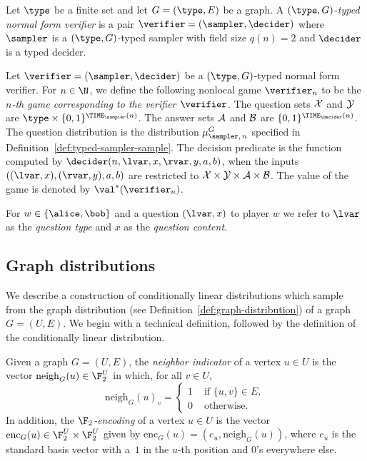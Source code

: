 \begin{definition}
  \label{def:typed-normal-ver}
  Let $\type$ be a finite set and let $G = (\type, E)$ be a graph.
  A $(\type, G)$-\emph{typed normal form verifier} is a pair $\verifier =
  (\sampler, \decider)$ where $\sampler$ is a $(\type,G)$-typed sampler with field
  size $q(n) = 2$ and $\decider$ is a typed decider.
\end{definition}

\begin{definition}
  \label{def:typed-normal-game}
  Let $\verifier = (\sampler, \decider)$ be a $(\type, G)$-typed normal form
  verifier.
  For $n \in \N$, we define the following nonlocal game $\verifier_{n}$ to be
  the \emph{$n$-th game corresponding to the verifier $\verifier$}.
  The question sets $\cal{X}$ and $\cal{Y}$ are $\type \times
  \{0,1\}^{\TIME_\sampler(n)}$.
  The answer sets $\cal{A}$ and $\cal{B}$ are $\{0,1\}^{\TIME_\decider(n)}$.
  The question distribution is the distribution $\mu^G_{\sampler,\, n}$
  specified in Definition~\ref{def:typed-sampler-sample}.
  The decision predicate is the function computed by
  $\decider(n,\lvar,x,\rvar,y,a,b)$, when the inputs $((\lvar, x), (\rvar, y), a, b)$ are
  restricted to $\cal{X}\times \cal{Y}\times\cal{A}\times\cal{B}$.
  The value of the game is denoted by $\val^*(\verifier_{n})$.  
\end{definition}

For $w\in\{\alice,\bob\}$ and a question $(\lvar, x)$ to player $w$ we refer to
$\lvar$ as the \emph{question type} and $x$ as the \emph{question content}.

\subsection{Graph distributions}
\label{sec:graph-dist}

We describe a construction of conditionally linear distributions which sample
from the graph distribution (see Definition~\ref{def:graph-distribution}) of a
graph $G = (U, E)$.
We begin with a technical definition, followed by the definition of the
conditionally linear distribution.

\begin{definition}\label{def:type-neighbor}
  Given a graph $G = (U, E)$, the \emph{neighbor indicator} of a vertex $u \in
  U$ is the vector $\mathrm{neigh}_G(u) \in \F_2^U$ in which, for all $v \in U$,
  \begin{equation*}
    \mathrm{neigh}_G(u)_v =
    \begin{cases}
      1 & \text{ if } \{u, v\} \in E,\\
      0 & \text{ otherwise}.
    \end{cases}
  \end{equation*}
  In addition, the \emph{$\F_2$-encoding} of a vertex $u \in U$ is the vector
  $\mathrm{enc}_G(u) \in \F_2^U \times \F_2^U$ given by $\mathrm{enc}_G(u) =
  (e_u, \mathrm{neigh}_G(u))$, where $e_u$ is the standard basis vector with
  a~$1$ in the $u$-th position and $0$'s everywhere else.
\end{definition}

